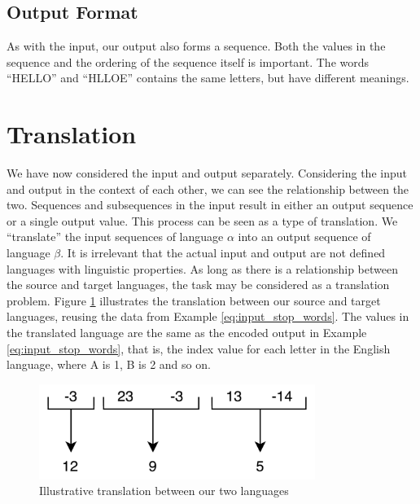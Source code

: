 \subsection{Output Format}
As with the input, our output also forms a sequence. Both the values in the sequence and the ordering of the sequence itself is important. The words ``HELLO'' and ``HLLOE'' contains the same letters, but have different meanings.


\section{Translation}
\label{sec:translation}
We have now considered the input and output separately. Considering the input and output in the context of each other, we can see the relationship between the two. Sequences and subsequences in the input result in either an output sequence or a single output value. This process can be seen as a type of translation. We ``translate'' the input sequences of language \(\alpha\) into an output sequence of language \(\beta\). It is irrelevant that the actual input and output are not defined languages with linguistic properties. As long as there is a relationship between the source and target languages, the task may be considered as a translation problem. Figure \ref{fig:number_translation} illustrates the translation between our source and target languages, reusing the data from Example \ref{eq:input_stop_words}. The values in the translated language are the same as the encoded output in Example \ref{eq:input_stop_words}, that is, the index value for each letter in the English language, where A is 1, B is 2 and so on.

\begin{figure}[ht]
    \centering
    \includegraphics[width=0.8\textwidth]{fig/background_theory/number_translation.png}
    \caption{Illustrative translation between our two languages}
    \label{fig:number_translation}
\end{figure}

